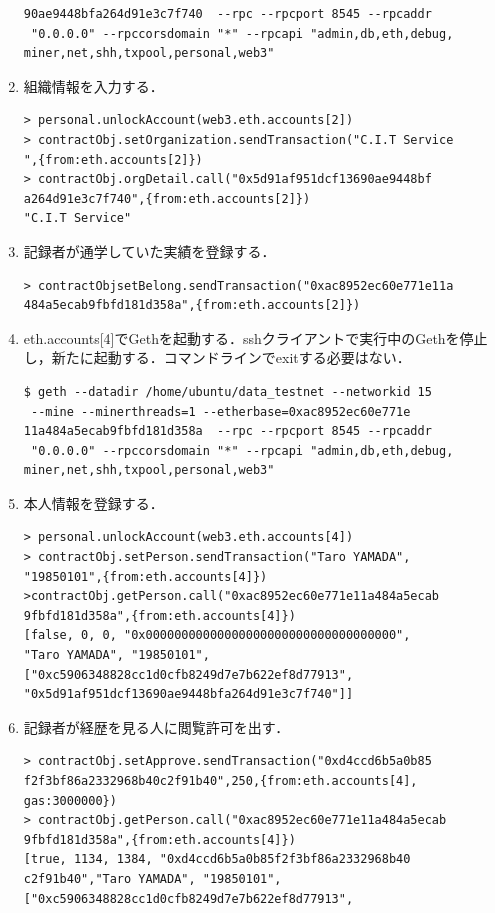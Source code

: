 \begin{enumerate}
\begin{verbatim}
90ae9448bfa264d91e3c7f740  --rpc --rpcport 8545 --rpcaddr
 "0.0.0.0" --rpccorsdomain "*" --rpcapi "admin,db,eth,debug,
miner,net,shh,txpool,personal,web3"
\end{verbatim}
\item 組織情報を入力する．
\begin{verbatim}
> personal.unlockAccount(web3.eth.accounts[2])
> contractObj.setOrganization.sendTransaction("C.I.T Service
",{from:eth.accounts[2]})
> contractObj.orgDetail.call("0x5d91af951dcf13690ae9448bf
a264d91e3c7f740",{from:eth.accounts[2]})
"C.I.T Service"
\end{verbatim}
\item 記録者が通学していた実績を登録する．
\begin{verbatim}
> contractObjsetBelong.sendTransaction("0xac8952ec60e771e11a
484a5ecab9fbfd181d358a",{from:eth.accounts[2]})
\end{verbatim}
\item eth.accounts[4]でGethを起動する．sshクライアントで実行中のGethを停止し，新たに起動する．コマンドラインでexitする必要はない．
\begin{verbatim}
$ geth --datadir /home/ubuntu/data_testnet --networkid 15
 --mine --minerthreads=1 --etherbase=0xac8952ec60e771e
11a484a5ecab9fbfd181d358a  --rpc --rpcport 8545 --rpcaddr
 "0.0.0.0" --rpccorsdomain "*" --rpcapi "admin,db,eth,debug,
miner,net,shh,txpool,personal,web3"
\end{verbatim}
\item 本人情報を登録する．
\begin{verbatim}
> personal.unlockAccount(web3.eth.accounts[4])
> contractObj.setPerson.sendTransaction("Taro YAMADA",
"19850101",{from:eth.accounts[4]})
>contractObj.getPerson.call("0xac8952ec60e771e11a484a5ecab
9fbfd181d358a",{from:eth.accounts[4]})
[false, 0, 0, "0x00000000000000000000000000000000000",
"Taro YAMADA", "19850101",
["0xc5906348828cc1d0cfb8249d7e7b622ef8d77913",
"0x5d91af951dcf13690ae9448bfa264d91e3c7f740"]]
\end{verbatim}
\newpage
\item 記録者が経歴を見る人に閲覧許可を出す．
\begin{verbatim}
> contractObj.setApprove.sendTransaction("0xd4ccd6b5a0b85
f2f3bf86a2332968b40c2f91b40",250,{from:eth.accounts[4], 
gas:3000000})
> contractObj.getPerson.call("0xac8952ec60e771e11a484a5ecab
9fbfd181d358a",{from:eth.accounts[4]})
[true, 1134, 1384, "0xd4ccd6b5a0b85f2f3bf86a2332968b40
c2f91b40","Taro YAMADA", "19850101",
["0xc5906348828cc1d0cfb8249d7e7b622ef8d77913",

\end{verbatim}
\end{enumerate}
